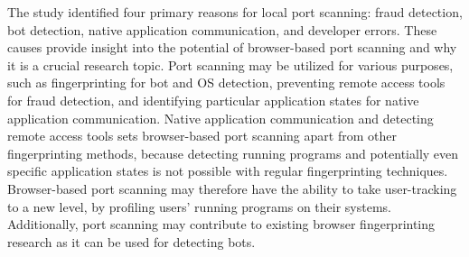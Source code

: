 The study identified four primary reasons for local port scanning: fraud detection, bot detection, native application communication, and developer errors. These causes provide insight into the potential of browser-based port scanning and why it is a crucial research topic. Port scanning may be utilized for various purposes, such as fingerprinting for bot and OS detection, preventing remote access tools for fraud detection, and identifying particular application states for native application communication. Native application communication and detecting remote access tools sets browser-based port scanning apart from other fingerprinting methods, because detecting running programs and potentially even specific application states is not possible with regular fingerprinting techniques. Browser-based port scanning may therefore have the ability to take user-tracking to a new level, by profiling users' running programs on their systems. Additionally, port scanning may contribute to existing browser fingerprinting research as it can be used for detecting bots. 








